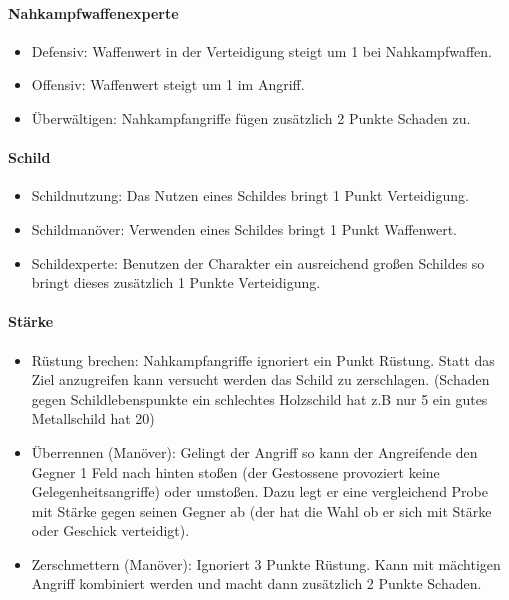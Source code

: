 \documentclass{article}
\begin{document}
\paragraph{Nahkampfwaffenexperte}

\begin{itemize}
\item Defensiv: Waffenwert in der Verteidigung steigt um 1 bei Nahkampfwaffen.
\item Offensiv: Waffenwert steigt um 1 im Angriff.
\item Überwältigen: Nahkampfangriffe fügen zusätzlich 2 Punkte Schaden zu.
\end{itemize}

\paragraph{Schild}

\begin{itemize}
\item Schildnutzung: Das Nutzen eines Schildes bringt 1 Punkt Verteidigung.
\item Schildmanöver: Verwenden eines Schildes bringt 1 Punkt Waffenwert.
\item Schildexperte: Benutzen der Charakter ein ausreichend großen Schildes so bringt dieses zusätzlich 1 Punkte Verteidigung.
\end{itemize}

\paragraph{Stärke}


\begin{itemize}
\item Rüstung brechen: Nahkampfangriffe ignoriert ein Punkt Rüstung. Statt das Ziel anzugreifen kann versucht werden das Schild zu zerschlagen. (Schaden gegen Schildlebenspunkte ein schlechtes Holzschild  hat z.B nur 5 ein gutes Metallschild hat 20)
\item Überrennen (Manöver): Gelingt der Angriff so kann der Angreifende den Gegner 1 Feld nach hinten stoßen (der Gestossene provoziert keine Gelegenheitsangriffe) oder umstoßen. Dazu legt er eine vergleichend Probe mit Stärke gegen seinen Gegner ab (der hat die Wahl ob er sich mit Stärke oder Geschick verteidigt).
\item Zerschmettern (Manöver): Ignoriert 3 Punkte Rüstung. Kann mit mächtigen Angriff kombiniert werden und macht dann zusätzlich 2 Punkte Schaden.
\end{itemize}
\end{document}
